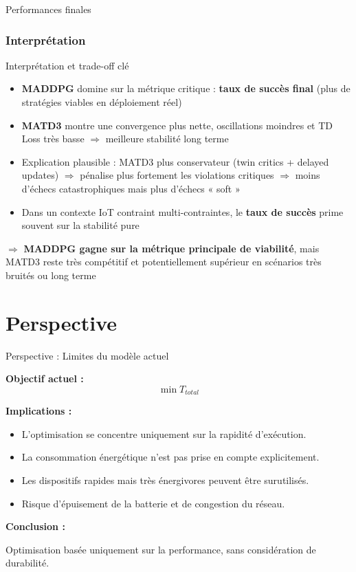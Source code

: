 \documentclass[aspectratio=169]{beamer}
\begin{document}
\begin{frame}{Performances finales}
\frametitle{Interprétation}
    \begin{alertblock}{Interprétation et trade-off clé}
        \begin{itemize}
            \item \textbf{MADDPG} domine sur la métrique critique : \textbf{taux de succès final} (plus de stratégies viables en déploiement réel)
            \item \textbf{MATD3} montre une convergence plus nette, oscillations moindres et TD Loss très basse $\Rightarrow$ meilleure stabilité long terme
            \item Explication plausible : MATD3 plus conservateur (twin critics + delayed updates) $\Rightarrow$ pénalise plus fortement les violations critiques $\Rightarrow$ moins d'échecs catastrophiques mais plus d'échecs « soft »
            \item Dans un contexte IoT contraint multi-contraintes, le \textbf{taux de succès} prime souvent sur la stabilité pure
        \end{itemize}
    \end{alertblock}

\centering
\alert{$\Rightarrow$ \textbf{MADDPG gagne sur la métrique principale de viabilité}, mais MATD3 reste très compétitif et potentiellement supérieur en scénarios très bruités ou long terme}
\end{frame}

\section{Perspective}
\begin{frame}{Perspective : Limites du modèle actuel}

\textbf{Objectif actuel :}
\[
\min T_{total}
\]

\textbf{Implications :}
\begin{itemize}
    \item L’optimisation se concentre uniquement sur la rapidité d’exécution.
    \item La consommation énergétique n’est pas prise en compte explicitement.
    \item Les dispositifs rapides mais très énergivores peuvent être surutilisés.
    \item Risque d’épuisement de la batterie et de congestion du réseau.
\end{itemize}

\textbf{Conclusion :}
\begin{block}{}
Optimisation basée uniquement sur la performance, sans considération de durabilité.
\end{block}

\end{frame}
\end{document}
